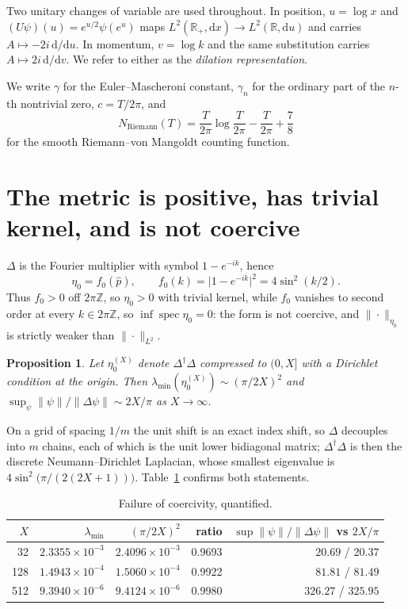 \documentclass[11pt,a4paper]{article}
\newtheorem{proposition}[theorem]{Proposition}
\theoremstyle{remark}
\newcommand{\R}{\mathbb{R}}
\newcommand{\Z}{\mathbb{Z}}
\newcommand{\dd}{\mathrm{d}}
\DeclareMathOperator{\spec}{spec}
\begin{document}
Two unitary changes of variable are used throughout. In position, $u=\log x$ and
$(U\psi)(u)=e^{u/2}\psi(e^u)$ maps $L^2(\R_+,\dd x)\to L^2(\R,\dd u)$ and carries
$A\mapsto-2i\,\dd/\dd u$. In momentum, $v=\log k$ and the same substitution carries
$A\mapsto 2i\,\dd/\dd v$. We refer to either as the \emph{dilation representation}.

We write $\gamma$ for the Euler--Mascheroni constant, $\gamma_n$ for the ordinary part of the
$n$-th nontrivial zero, $c=T/2\pi$, and
\[
N_{\mathrm{Riemann}}(T)=\frac{T}{2\pi}\log\frac{T}{2\pi}-\frac{T}{2\pi}+\frac78
\]
for the smooth Riemann--von Mangoldt counting function.

\section{The metric is positive, has trivial kernel, and is not coercive}\label{sec:coerc}

$\Delta$ is the Fourier multiplier with symbol $1-e^{-ik}$, hence
\begin{equation}\label{eq:symbol}
\eta_0=f_0(\hat p),\qquad f_0(k)=\bigl|1-e^{-ik}\bigr|^2=4\sin^2(k/2).
\end{equation}
Thus $f_0>0$ off $2\pi\Z$, so $\eta_0>0$ with trivial kernel, while $f_0$ vanishes to second order
at every $k\in2\pi\Z$, so $\inf\spec\eta_0=0$: the form is not coercive, and
$\|\cdot\|_{\eta_0}$ is strictly weaker than $\|\cdot\|_{L^2}$.

\begin{proposition}\label{prop:coerc}
Let $\eta_0^{(X)}$ denote $\Delta^\dagger\Delta$ compressed to $(0,X]$ with a Dirichlet condition at
the origin. Then $\lambda_{\min}(\eta_0^{(X)})\sim(\pi/2X)^2$ and
$\sup_\psi\|\psi\|/\|\Delta\psi\|\sim2X/\pi$ as $X\to\infty$.
\end{proposition}

On a grid of spacing $1/m$ the unit shift is an exact index shift, so $\Delta$ decouples into $m$
chains, each of which is the unit lower bidiagonal matrix; $\Delta^\dagger\Delta$ is then the
discrete Neumann--Dirichlet Laplacian, whose smallest eigenvalue is
$4\sin^2\bigl(\pi/(2(2X+1))\bigr)$. Table~\ref{tab:coerc} confirms both statements.

\begin{table}[h]
\centering
\begin{tabular}{rrrrr}
\toprule
$X$ & $\lambda_{\min}$ & $(\pi/2X)^2$ & ratio & $\sup\|\psi\|/\|\Delta\psi\|$ vs $2X/\pi$\\
\midrule
32  & $2.3355\times10^{-3}$ & $2.4096\times10^{-3}$ & 0.9693 & $20.69$ / $20.37$\\
128 & $1.4943\times10^{-4}$ & $1.5060\times10^{-4}$ & 0.9922 & $81.81$ / $81.49$\\
512 & $9.3940\times10^{-6}$ & $9.4124\times10^{-6}$ & 0.9980 & $326.27$ / $325.95$\\
\bottomrule
\end{tabular}
\caption{Failure of coercivity, quantified.}\label{tab:coerc}
\end{table}
\end{document}
